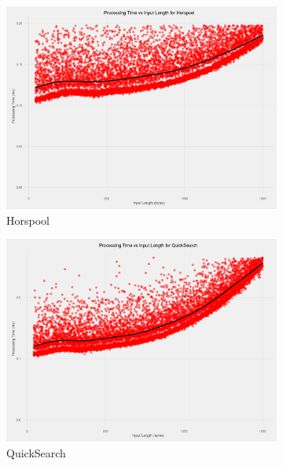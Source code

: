 \documentclass[11pt]{article}
\begin{document}
\begin{figure}[!htb]
  \centering
  \begin{subfigure}[b]{0.48\textwidth}
      \includegraphics[width=\textwidth]{images/processing_speed_vs_input_length_no_matches_Horspool}
      \caption{Horspool}
      \label{figure-processingtimevslengthhorspool}
  \end{subfigure}
  \begin{subfigure}[b]{0.48\textwidth}
      \includegraphics[width=\textwidth]{images/processing_speed_vs_input_length_no_matches_QuickSearch}
      \caption{QuickSearch}
      \label{figure-processingtimevslengthquicksearch}
  \end{subfigure}
  ~
  \begin{subfigure}[b]{0.48\textwidth}

\end{subfigure}
\end{figure}
\end{document}
